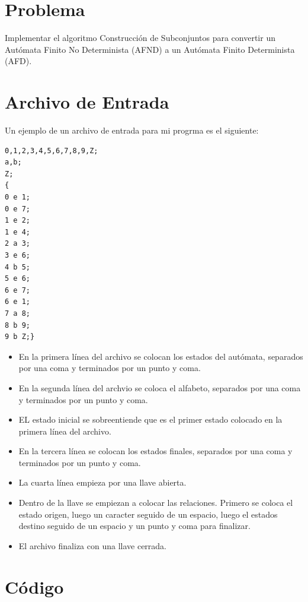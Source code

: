 \documentclass[a4paper,12pt]{article}
\begin{document}
\section{Problema}
Implementar el algoritmo Construcción de Subconjuntos para convertir un Autómata Finito No Determinista (AFND) a
un Autómata Finito Determinista (AFD).
\section{Archivo de Entrada}
Un ejemplo de un archivo de entrada para mi progrma es el siguiente:
\begin{lstlisting}
0,1,2,3,4,5,6,7,8,9,Z;
a,b;
Z;
{
0 e 1;
0 e 7;
1 e 2;
1 e 4;
2 a 3;
3 e 6;
4 b 5;
5 e 6;
6 e 7;
6 e 1;
7 a 8;
8 b 9;
9 b Z;}
\end{lstlisting}
\begin{itemize}
 \item En la primera línea del archivo se colocan los estados del autómata, separados por una coma y terminados por un punto y coma.
 \item En la segunda línea del archvio se coloca el alfabeto, separados por una coma y terminados por un punto y coma.
 \item EL estado inicial se sobreentiende que es el primer estado colocado en la primera línea del archivo.
 \item En la tercera línea se colocan los estados finales, separados por una coma y terminados por un punto y coma.
 \item La cuarta línea empieza por una llave abierta.
 \item Dentro de la llave se empiezan a colocar las relaciones. Primero se coloca el estado origen, luego un caracter seguido de un espacio, luego el estados destino seguido de un espacio y un punto y coma para finalizar.
 \item El archivo finaliza con una llave cerrada.
\end{itemize}

\section{Código}
\end{document}
